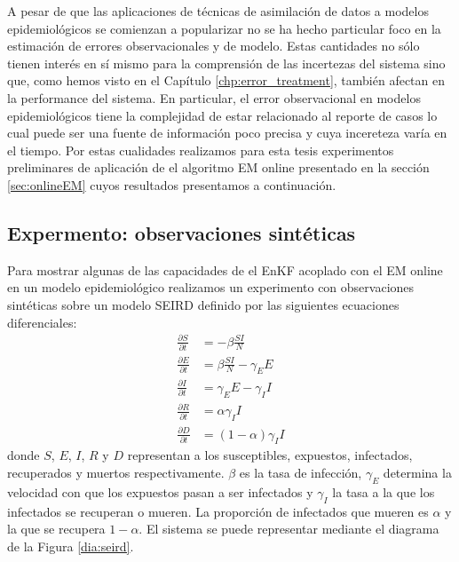 A pesar de que las aplicaciones de técnicas de asimilación de datos a modelos epidemiológicos se comienzan a popularizar no se ha hecho particular foco en la estimación de errores observacionales y de modelo. Estas cantidades no sólo tienen interés en sí mismo para la comprensión de las incertezas del sistema sino que, como hemos visto en el Capítulo \ref{chp:error_treatment}, también afectan en la performance del sistema. En particular, el error observacional en modelos epidemiológicos tiene la complejidad de estar relacionado al reporte de casos lo cual puede ser una fuente de información poco precisa y cuya incereteza varía en el tiempo. Por estas cualidades realizamos para esta tesis experimentos preliminares de aplicación de el algoritmo EM online presentado en la sección \ref{sec:onlineEM} cuyos resultados presentamos a continuación.

\subsection{Expermento: observaciones sintéticas} \label{sec:online_em_seird_synthetic}
Para mostrar algunas de las capacidades de el EnKF acoplado con el EM online en un modelo epidemiológico realizamos un experimento con observaciones sintéticas sobre un modelo SEIRD definido por las siguientes ecuaciones diferenciales:
\begin{align} \label{eq:seird}
    \frac{\partial S}{\partial t} &= -\beta \frac{SI}{N}\\
    \frac{\partial E}{\partial t} &= \beta \frac{SI}{N} - \gamma_E E \\
    \frac{\partial I}{\partial t} &= \gamma_E E - \gamma_I I \\
    \frac{\partial R}{\partial t} &= \alpha \gamma_I I \\
    \frac{\partial D}{\partial t} &= (1-\alpha) \gamma_I I
\end{align}
donde $S$, $E$, $I$, $R$ y $D$ representan a los susceptibles, expuestos, infectados, recuperados y muertos respectivamente. $\beta$ es la tasa de infección, $\gamma_E$ determina la velocidad con que los expuestos pasan a ser infectados y $\gamma_I$ la tasa a la que los infectados se recuperan o mueren. La proporción de infectados que mueren es $\alpha$ y la que se recupera $1 - \alpha$. El sistema se puede representar mediante el diagrama de la Figura \ref{dia:seird}. 

